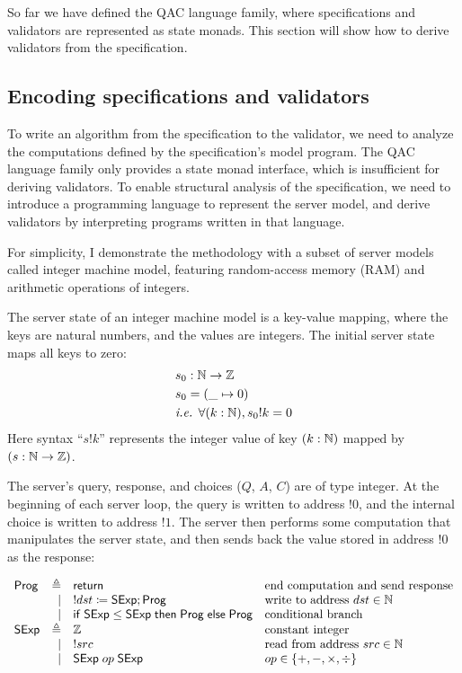 So far we have defined the QAC language family, where specifications and
validators are represented as state monads.  This section will show how to
derive validators from the specification.

\subsection{Encoding specifications and validators}
\label{sec:proglang}
To write an algorithm from the specification to the validator, we need to
analyze the computations defined by the specification's model program.  The QAC
language family only provides a state monad interface, which is insufficient for
deriving validators.  To enable structural analysis of the specification, we
need to introduce a programming language to represent the server model, and
derive validators by interpreting programs written in that language.

For simplicity, I demonstrate the methodology with a subset of server models
called integer machine model, featuring random-access memory (RAM) and
arithmetic operations of integers.

\begin{definition}
  The server state of an integer machine model is a key-value mapping, where the
  keys are natural numbers, and the values are integers.  The initial server
  state maps all keys to zero:
  \begin{align*}
    &s_0:\mathbb N\to\mathbb Z\\
    &s_0=(\_\mapsto0)\\
    &\textit{i.e. }\forall (k:\mathbb N), s_0!k=0
  \end{align*}
  Here syntax ``$s!k$'' represents the integer value of key $(k:\mathbb N)$ mapped by
  $(s:\mathbb N\to\mathbb Z)$.

  The server's query, response, and choices ($Q$, $A$, $C$) are of type integer.
  At the beginning of each server loop, the query is written to address $!0$,
  and the internal choice is written to address $!1$.  The server then performs
  some computation that manipulates the server state, and then sends back the
  value stored in address $!0$ as the response:
\end{definition}


\[\begin{array}{lrll}
\Prog&\triangleq&\Return&\text{end computation and send response}\\
&\mid&!dst\coloneqq\Sexp;\Prog&\text{write to address }dst\in\Nat\\\null
&\mid&\If\Sexp\le\Sexp\Then\Prog\Else\Prog&\text{conditional branch}\\
\Sexp&\triangleq&\Int&\text{constant integer}\\
&\mid&!src&\text{read from address }src\in\Nat\\
&\mid&\Sexp\oop\Sexp&op\in\{+,-,\times,\div\}
\end{array}
\]

